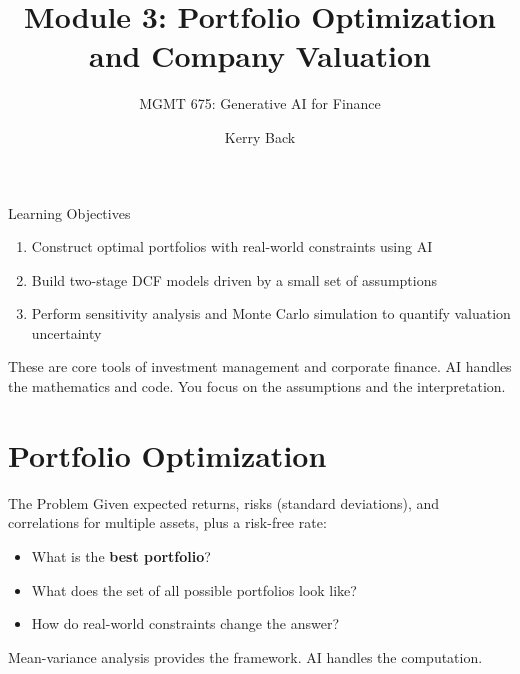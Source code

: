 \documentclass[aspectratio=169]{beamer}
\subtitle{MGMT 675: Generative AI for Finance}
\title{Module 3: Portfolio Optimization and Company Valuation}
\author{Kerry Back}
\date{}
\begin{document}
\maketitle

\begin{frame}{Learning Objectives}
\begin{enumerate}
  \item Construct optimal portfolios with real-world constraints using AI
  \item Build two-stage DCF models driven by a small set of assumptions
  \item Perform sensitivity analysis and Monte Carlo simulation to quantify valuation uncertainty
\end{enumerate}

\vspace{0.5cm}
These are core tools of investment management and corporate finance.  AI handles the mathematics and code.  \alert{You focus on the assumptions and the interpretation.}
\end{frame}

\section{Portfolio Optimization}

\begin{frame}{The Problem}
Given expected returns, risks (standard deviations), and correlations for multiple assets, plus a risk-free rate:

\begin{itemize}
  \item What is the \textbf{best portfolio}?
  \item What does the set of all possible portfolios look like?
  \item How do real-world constraints change the answer?
\end{itemize}

\vspace{0.3cm}
Mean-variance analysis provides the framework.  AI handles the computation.
\end{frame}
\end{document}
